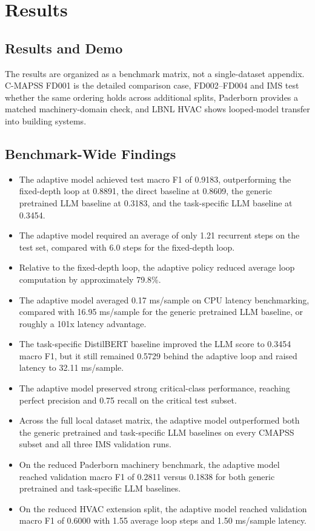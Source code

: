 \section{Results}
\subsection{Results and Demo}
The results are organized as a benchmark matrix, not a single-dataset appendix. C-MAPSS FD001 is the detailed comparison case, FD002--FD004 and IMS test whether the same ordering holds across additional splits, Paderborn provides a matched machinery-domain check, and LBNL HVAC shows looped-model transfer into building systems.

\subsection{Benchmark-Wide Findings}
\begin{itemize}
    \item The adaptive model achieved test macro F1 of 0.9183, outperforming the fixed-depth loop at 0.8891, the direct baseline at 0.8609, the generic pretrained LLM baseline at 0.3183, and the task-specific LLM baseline at 0.3454.
    \item The adaptive model required an average of only 1.21 recurrent steps on the test set, compared with 6.0 steps for the fixed-depth loop.
    \item Relative to the fixed-depth loop, the adaptive policy reduced average loop computation by approximately 79.8\%.
    \item The adaptive model averaged 0.17 ms/sample on CPU latency benchmarking, compared with 16.95 ms/sample for the generic pretrained LLM baseline, or roughly a 101x latency advantage.
    \item The task-specific DistilBERT baseline improved the LLM score to 0.3454 macro F1, but it still remained 0.5729 behind the adaptive loop and raised latency to 32.11 ms/sample.
    \item The adaptive model preserved strong critical-class performance, reaching perfect precision and 0.75 recall on the critical test subset.
    \item Across the full local dataset matrix, the adaptive model outperformed both the generic pretrained and task-specific LLM baselines on every CMAPSS subset and all three IMS validation runs.
    \item On the reduced Paderborn machinery benchmark, the adaptive model reached validation macro F1 of 0.2811 versus 0.1838 for both generic pretrained and task-specific LLM baselines.
    \item On the reduced HVAC extension split, the adaptive model reached validation macro F1 of 0.6000 with 1.55 average loop steps and 1.50 ms/sample latency.
\end{itemize}

